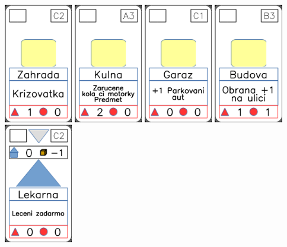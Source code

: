 \documentclass[a4paper]{article}
\begin{document}
	\includegraphics[width=3.0cm]{img-2_26}
	\includegraphics[width=3.0cm]{img-2_17}
	\includegraphics[width=3.0cm]{img-2_10}
	\includegraphics[width=3.0cm]{img-2_7}
	\includegraphics[width=3.0cm]{img-3_11}
\end{document}
